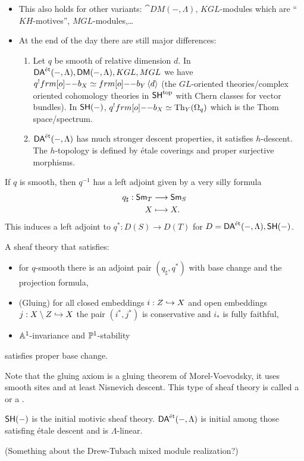 \begin{remark}\leavevmode
\begin{itemize}
\item This also holds for other variants: $\cat{DM}(-,\Lambda)$, $KGL$-modules which are
``$KH$-motives'',  $MGL$-modules,\dots
\item At the end of the day there are still major differences:
\begin{enumerate}[1)]
\item Let $q$ be smooth of relative dimension $d$. In $\DAet(-,\Lambda),
\cat{DM}(-,\Lambda), KGL, MGL$ we have $q^{!}\1b_X \isoto \1b_Y \left<d \right>$ (the
$GL$-oriented theories/complex oriented cohomology theories in $\SH^{\text{top}}$ with
Chern classes for vector bundles). In $\SH(-)$, $q^{!}\1b_X\isoto
\operatorname{Th}_Y(\Omega_q)$ which is the Thom space/spectrum.
\item $\DAet(-,\Lambda)$ has much stronger descent properties, it satisfies $h$-descent.
The $h$-topology is defined by \'etale coverings and proper surjective morphisms.
\end{enumerate}
\end{itemize}
\end{remark}
If $q$ is smooth, then $q^{-1}$ has a left adjoint given by a very silly formula
\begin{align*}
q_\sharp: \Sm_T &\longrightarrow \Sm_S \\
X &\longmapsto X.
\end{align*}
This induces a left adjoint to $q^{*}:D(S)\to D(T)$ for $D=\DAet(-,\Lambda),\SH(-)$.

\begin{theorem}
A sheaf theory that satisfies:
\begin{itemize}
\item for $q$-smooth there is an adjoint pair $(q_\sharp,q^{*})$ with base change and the
projection formula,
\item (Gluing) for all closed embeddings $i:Z\injto X$ and open embeddings $j:X\setminus
Z\injto X$ the pair $(i^{*},j^{*})$ is conservative and $i_*$ is fully faithful,
\item $\Aff^{1}$-invariance and $\P^{1}$-stability
\end{itemize}
satisfies proper base change.
\end{theorem}
Note that the gluing axiom is a gluing theorem of Morel-Voevodsky, it uses smooth sites
and at least Nisnevich descent. This type of sheaf theory is called a  or a .
\begin{theorem}
$\SH(-)$ is the initial motivic sheaf theory. $\DAet(-,\Lambda)$ is initial among those
satisfing \'etale descent and is $\Lambda$-linear.
\end{theorem}
(Something about the Drew-Tubach mixed module realization?)

